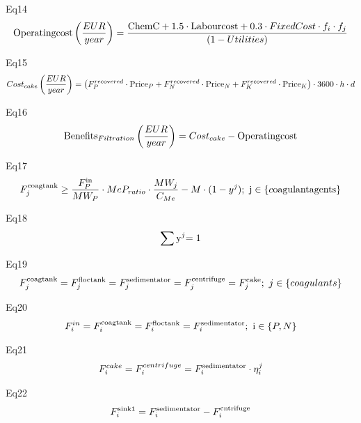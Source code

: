 \documentclass[10pt,a4paper]{article}
\begin{document}
Eq14
\begin{align}
	{\rm{Operating cost}}\left( {\frac{EUR }{{year}}} \right) = \frac{{{\rm{ChemC}} + 1.5\cdot{\rm{Labour cost}} + 0.3\cdot FixedCost\cdot{f_i}\cdot{f_j}}}{{(1 - Utilities)}}
\end{align}

Eq15
\begin{align}
	Cos{t_{cake}}\left( {\frac{EUR }{{year}}} \right) = \left( {F_P^{re{\mathop{\rm cov}} ered}\cdot{\rm{Pric}}{{\rm{e}}_P} + F_N^{re{\mathop{\rm cov}} ered}\cdot{\rm{Pric}}{{\rm{e}}_N} + F_K^{re{\mathop{\rm cov}} ered}\cdot{\rm{Pric}}{{\rm{e}}_K}} \right) \cdot 3600\cdot h \cdot d
\end{align}

Eq16
\begin{align}
	{\rm{Benefit}}{{\rm{s}}_{Filtration}}\left( {\frac{EUR }{{year}}} \right) = Cos{t_{cake}} - {\rm{Operating cost}}
\end{align}

Eq17
\begin{align}
	F_j^{{\rm{coag tank}}} \ge \frac{{F_P^{{\rm{in}}}}}{{M{W_P}}} \cdot Me{P_{ratio}} \cdot \frac{{M{W_j}}}{{{C_{Me}}}} - M \cdot (1 - {y^j}); \ {\rm{    j}} \in \left\{ {c{\rm{oagulant agents}}} \right\}
\end{align}

Eq18
\begin{align}
	\sum {{{\rm{y}}^j}} {\rm{ = 1}}
\end{align}

Eq19
\begin{align}
	F_j^{{\rm{coag tank}}} = F_j^{{\rm{floc tank}}} = F_j^{{\rm{sedimentator}}} = F_j^{{\rm{centrifuge}}} = F_j^{{\rm{cake}}}; \ j \in \left\{ {coagulants} \right\}
\end{align}

Eq20
\begin{align}
	F_i^{in} = F_i^{{\rm{coag tank}}} = F_i^{{\rm{floc tank}}} = F_i^{{\rm{sedimentator}}}; \ {\rm{    i}} \in \left\{ {P,N} \right\}
\end{align}

Eq21
\begin{align}
	F_i^{cake} = F_i^{centrifuge} = F_i^{{\rm{sedimentator}}} \cdot \eta _i^j
\end{align}

Eq22
\begin{align}
	F_i^{{\rm{sink1}}} = F_i^{{\rm{sedimentator}}} - F_i^{{\rm{cntrifuge}}}
\end{align}
\end{document}
